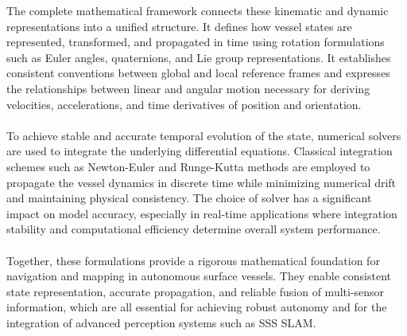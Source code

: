 The complete mathematical framework connects these kinematic and dynamic representations into a unified structure. It defines how vessel states are represented, transformed, and propagated in time using rotation formulations such as Euler angles, quaternions, and Lie group representations. It establishes consistent conventions between global and local reference frames and expresses the relationships between linear and angular motion necessary for deriving velocities, accelerations, and time derivatives of position and orientation.  
\\ \\
To achieve stable and accurate temporal evolution of the state, numerical solvers are used to integrate the underlying differential equations. Classical integration schemes such as Newton-Euler and Runge-Kutta methods are employed to propagate the vessel dynamics in discrete time while minimizing numerical drift and maintaining physical consistency. The choice of solver has a significant impact on model accuracy, especially in real-time applications where integration stability and computational efficiency determine overall system performance.  
\\ \\
Together, these formulations provide a rigorous mathematical foundation for navigation and mapping in autonomous surface vessels. They enable consistent state representation, accurate propagation, and reliable fusion of multi-sensor information, which are all essential for achieving robust autonomy and for the integration of advanced perception systems such as SSS SLAM.
